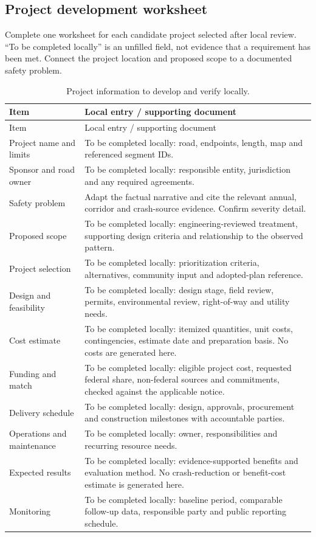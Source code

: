 \documentclass[10pt,letterpaper]{article}
\begin{document}
\newpage
\subsection{Project development worksheet}
Complete one worksheet for each candidate project selected after local review.
``To be completed locally'' is an unfilled field, not evidence that a requirement
has been met. Connect the project location and proposed scope to a documented safety
problem.\cite{implementation}
\begin{small}
\begin{longtable}{@{}L{140pt}L{290pt}@{}}
\caption{Project information to develop and verify locally.}\\
\toprule Item & Local entry / supporting document \\\midrule\endfirsthead
\toprule Item & Local entry / supporting document \\\midrule\endhead
\bottomrule\endfoot
Project name and limits & To be completed locally: road, endpoints, length, map and referenced segment IDs. \\
Sponsor and road owner & To be completed locally: responsible entity, jurisdiction and any required agreements. \\
Safety problem & Adapt the factual narrative and cite the relevant annual, corridor and crash-source evidence. Confirm severity detail. \\
Proposed scope & To be completed locally: engineering-reviewed treatment, supporting design criteria and relationship to the observed pattern. \\
Project selection & To be completed locally: prioritization criteria, alternatives, community input and adopted-plan reference. \\
Design and feasibility & To be completed locally: design stage, field review, permits, environmental review, right-of-way and utility needs. \\
Cost estimate & To be completed locally: itemized quantities, unit costs, contingencies, estimate date and preparation basis. No costs are generated here. \\
Funding and match & To be completed locally: eligible project cost, requested federal share, non-federal sources and commitments, checked against the applicable notice. \\
Delivery schedule & To be completed locally: design, approvals, procurement and construction milestones with accountable parties. \\
Operations and maintenance & To be completed locally: owner, responsibilities and recurring resource needs. \\
Expected results & To be completed locally: evidence-supported benefits and evaluation method. No crash-reduction or benefit-cost estimate is generated here. \\
Monitoring & To be completed locally: baseline period, comparable follow-up data, responsible party and public reporting schedule. \\
\end{longtable}
\end{small}
\end{document}
